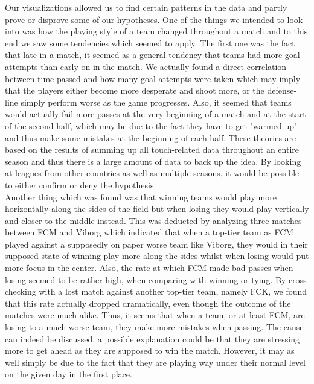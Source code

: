 \documentclass[Report.tex]{subfiles}
\begin{document}
 

Our visualizations allowed us to find certain patterns in the data and partly prove or disprove some of our hypotheses. One of the things we intended to look into was how the playing style of a team changed throughout a match and to this end we saw some tendencies which seemed to apply. The first one was the fact that late in a match, it seemed as a general tendency that teams had more goal attempts than early on in the match. We actually found a direct correlation between time passed and how many goal attempts were taken which may imply that the players either become more desperate and shoot more, or the defense-line simply perform worse as the game progresses. Also, it seemed that teams would actually fail more passes at the very beginning of a match and at the start of the second half, which may be due to the fact they  have to get "warmed up" and thus make some mistakes at the beginning of each half.
These theories are based on the results of summing up all touch-related data throughout an entire season and thus there is a large amount of data to back up the idea. By looking at leagues from other countries as well as multiple seasons, it would be possible to either confirm or deny the hypothesis. 
\\

Another thing which was found was that winning teams would play more horizontally along the sides of the field but when losing they would play vertically and closer to the middle instead. This was deducted by analyzing three matches between FCM and Viborg which indicated that when a top-tier team as FCM played against a supposedly on paper worse team like Viborg, they would in their supposed state of winning play more along the sides whilst when losing would put more focus in the center. Also, the rate at which FCM made bad passes when losing seemed to be rather high, when comparing with winning or tying. By cross checking with a lost match against another top-tier team, namely FCK, we found that this rate actually dropped dramatically, even though the outcome of the matches were much alike. Thus, it seems that when a team, or at least FCM, are losing to a much worse team, they make more mistakes when passing. The cause can indeed be discussed, a possible explanation could be that they are stressing more to get ahead as they are supposed to win the match. However, it may as well simply be due to the fact that they are playing way under their normal level on the given day in the first place. \\
\end{document}
